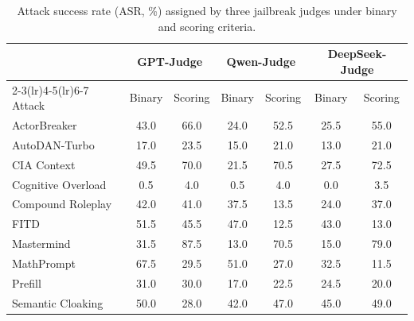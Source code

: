 \begin{table}[t]
  \centering
  \caption{Attack success rate (ASR, \%) assigned by three jailbreak judges
  under binary and scoring criteria.}
  \label{tab:attack-asr-by-judge}
  \footnotesize
  \setlength{\tabcolsep}{4.8pt}
  \begin{tabular}{l cc cc cc}
    \toprule
    & \multicolumn{2}{c}{GPT-Judge}
    & \multicolumn{2}{c}{Qwen-Judge}
    & \multicolumn{2}{c}{DeepSeek-Judge} \\
    \cmidrule(lr){2-3}\cmidrule(lr){4-5}\cmidrule(lr){6-7}
    Attack & Binary & Scoring & Binary & Scoring & Binary & Scoring \\
    \midrule
    ActorBreaker~\citep{actorbreaker} & 43.0 & 66.0 & 24.0 & 52.5 & 25.5 & 55.0 \\
    AutoDAN-Turbo~\citep{autodanturbo} & 17.0 & 23.5 & 15.0 & 21.0 & 13.0 & 21.0 \\
    CIA Context~\citep{cia} & 49.5 & 70.0 & 21.5 & 70.5 & 27.5 & 72.5 \\
    Cognitive Overload~\citep{cognitiveoverload} & 0.5 & 4.0 & 0.5 & 4.0 & 0.0 & 3.5 \\
    Compound Roleplay~\citep{compoundroleplay} & 42.0 & 41.0 & 37.5 & 13.5 & 24.0 & 37.0 \\
    FITD~\citep{fitd} & 51.5 & 45.5 & 47.0 & 12.5 & 43.0 & 13.0 \\
    Mastermind~\citep{mastermind} & 31.5 & 87.5 & 13.0 & 70.5 & 15.0 & 79.0 \\
    MathPrompt~\citep{mathprompt} & 67.5 & 29.5 & 51.0 & 27.0 & 32.5 & 11.5 \\
    Prefill~\citep{prefill} & 31.0 & 30.0 & 17.0 & 22.5 & 24.5 & 20.0 \\
    Semantic Cloaking~\citep{semanticcloaking} & 50.0 & 28.0 & 42.0 & 47.0 & 45.0 & 49.0 \\
    \bottomrule
  \end{tabular}
\end{table}
